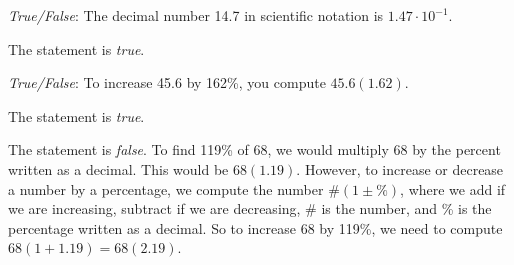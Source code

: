 \documentclass[11pt,letterpaper]{article}
\begin{document}
\quizsol \textit{True/False}: The decimal number 14.7 in scientific notation is $1.47 \cdot 10^{-1}$. \pspace

\sol The statement is \textit{true}. 


\quizsol \textit{True/False}: To increase 45.6 by 162\%, you compute $45.6(1.62)$. \pspace

\sol The statement is \textit{true}. 


The statement is \textit{false}. To find 119\% of 68, we would multiply 68 by the percent written as a decimal. This would be $68(1.19)$. However, to increase or decrease a number by a percentage, we compute the number $\#(1 \pm \%)$, where we add if we are increasing, subtract if we are decreasing, $\#$ is the number, and \% is the percentage written as a decimal. So to increase 68 by 119\%, we need to compute $68(1 + 1.19)= 68(2.19)$. 




\end{document}
